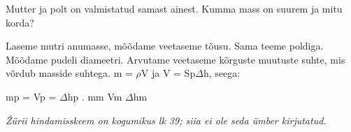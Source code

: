 
Mutter ja polt on valmistatud samast ainest. Kumma mass on suurem ja mitu korda?

\hint

\solu
Laseme mutri anumasse, mõõdame veetaseme tõusu. Sama teeme poldiga. Mõõdame pudeli diameetri. Arvutame veetaseme kõrguste muutuste suhte, mis võrdub masside suhtega. m = $\rho$V ja V = Sp$\Delta$h, seega:

mp = Vp = $\Delta$hp . mm Vm $\Delta$hm

\textit{Žürii hindamisskeem on kogumikus lk 39; siia ei ole seda ümber kirjutatud.}
\probend
